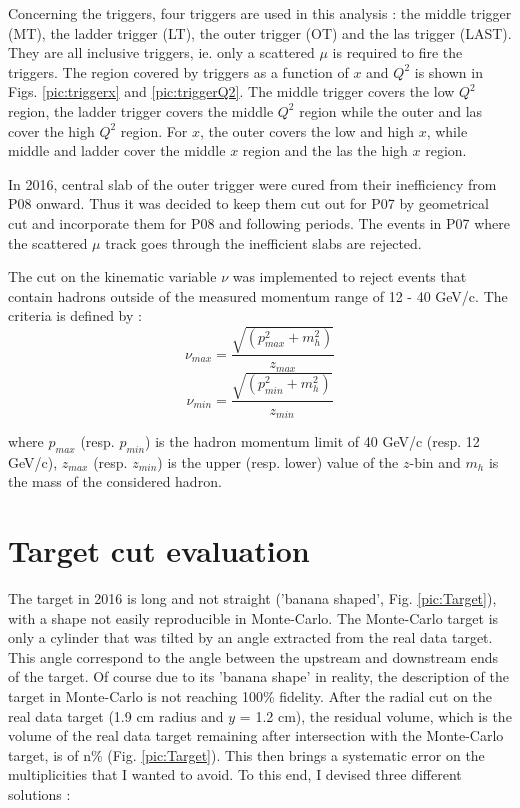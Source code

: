 Concerning the triggers, four triggers are used in this analysis : the middle trigger (MT), the ladder trigger (LT), the outer trigger (OT) and the las trigger (LAST). They are all inclusive triggers, ie. only a scattered $\mu$ is required to fire the triggers. The region covered by triggers as a function of $x$ and $Q^2$ is shown in Figs. \ref{pic:triggerx} and \ref{pic:triggerQ2}. The middle trigger covers the low $Q^2$ region, the ladder trigger covers the middle $Q^2$ region while the outer and las cover the high $Q^2$ region. For $x$, the outer covers the low and high $x$, while middle and ladder cover the middle $x$ region and the las the high $x$ region.

In 2016, central slab of the outer trigger were cured from their inefficiency from P08 onward. Thus it was decided to keep them cut out for P07 by geometrical cut and incorporate them for P08 and following periods. The events in P07 where the scattered $\mu$ track goes through the inefficient slabs are rejected.

The cut on the kinematic variable $\nu$ was implemented to reject events that contain hadrons outside of the measured
momentum range of 12 - 40 GeV/c. The criteria is defined by :
\begin{equation}
  \nu_{max} = \frac{\sqrt{(p^2_{max}+m^2_h)}}{z_{max}}
\end{equation}
\begin{equation}
  \nu_{min} = \frac{\sqrt{(p^2_{min}+m^2_h)}}{z_{min}}
\end{equation}

where $p_{max}$ (resp. $p_{min}$) is the hadron momentum limit of 40 GeV/c (resp. 12 GeV/c), $z_{max}$ (resp. $z_{min}$)
is the upper (resp. lower) value of the $z$-bin and $m_h$ is the mass of the considered hadron.


\section{Target cut evaluation}

The target in 2016 is long and not straight ('banana shaped', Fig. \ref{pic:Target}), with a shape not easily reproducible in Monte-Carlo. The Monte-Carlo target is only a cylinder that was tilted by an angle extracted from the real data target. This angle correspond to the angle between the upstream and downstream ends of the target. Of course due to its 'banana shape' in reality, the description of the target in Monte-Carlo is not reaching 100\% fidelity. After the radial cut on the real data target (1.9 cm radius and $y$ = 1.2 cm), the residual volume, which is the volume of the real data target remaining after intersection with the Monte-Carlo target, is of n\% (Fig. \ref{pic:Target}). This then brings a systematic error on the multiplicities that I wanted to avoid. To this end, I devised three different solutions :

